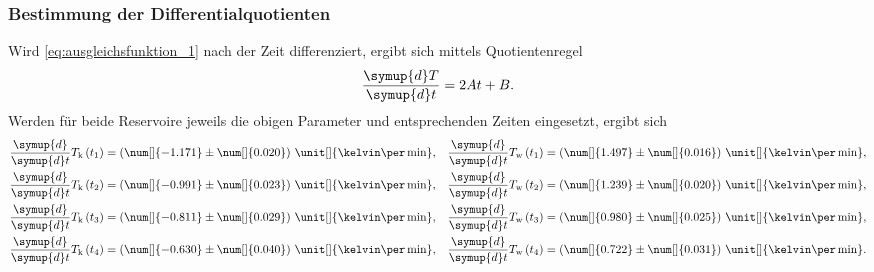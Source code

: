 % 


\subsubsection{Bestimmung der Differentialquotienten}
\label{sec: dif_quot}
Wird \eqref{eq:ausgleichsfunktion_1} nach der Zeit differenziert, ergibt sich mittels Quotientenregel
\begin{align*}
    \frac{\symup{d}T}{\symup{d}t} = 2 A t + B.
\end{align*}
%
Werden für beide Reservoire jeweils die obigen Parameter und entsprechenden Zeiten eingesetzt, ergibt sich 
\begin{align*}
    \frac{\symup{d}}{\symup{d}t} T_\text{k} \left(t_1\right) &= \left(\num[]{-1.171} \pm \num[]{0.020} \right)\, \unit[]{\kelvin\per\min},  &
    \frac{\symup{d}}{\symup{d}t} T_\text{w} \left(t_1\right) &= \left(\num[]{ 1.497} \pm \num[]{0.016} \right)\, \unit[]{\kelvin\per\min},   \\
    \frac{\symup{d}}{\symup{d}t} T_\text{k} \left(t_2\right) &= \left(\num[]{-0.991} \pm \num[]{0.023} \right)\, \unit[]{\kelvin\per\min},  &
    \frac{\symup{d}}{\symup{d}t} T_\text{w} \left(t_2\right) &= \left(\num[]{ 1.239} \pm \num[]{0.020} \right)\, \unit[]{\kelvin\per\min}, \\
    \frac{\symup{d}}{\symup{d}t} T_\text{k} \left(t_3\right) &= \left(\num[]{-0.811} \pm \num[]{0.029} \right)\, \unit[]{\kelvin\per\min}, &
    \frac{\symup{d}}{\symup{d}t} T_\text{w} \left(t_3\right) &= \left(\num[]{ 0.980} \pm \num[]{0.025} \right)\, \unit[]{\kelvin\per\min}, \\
    \frac{\symup{d}}{\symup{d}t} T_\text{k} \left(t_4\right) &= \left(\num[]{-0.630} \pm \num[]{0.040} \right)\, \unit[]{\kelvin\per\min},  &
    \frac{\symup{d}}{\symup{d}t} T_\text{w} \left(t_4\right) &= \left(\num[]{ 0.722} \pm \num[]{0.031} \right)\, \unit[]{\kelvin\per\min}.
\end{align*}
%

